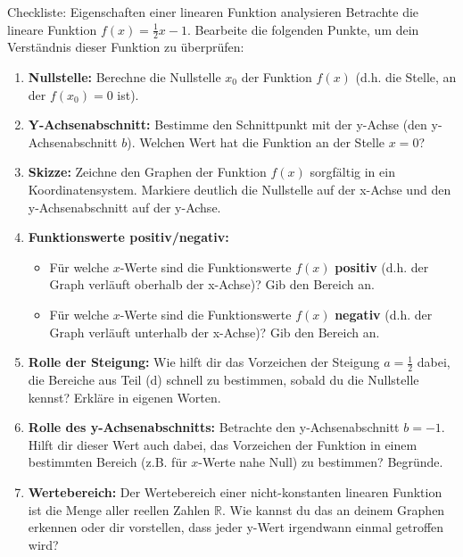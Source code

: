 \begin{aufgabenumgebung}{Checkliste: Eigenschaften einer linearen Funktion analysieren}
Betrachte die lineare Funktion $f(x) = \frac{1}{2}x - 1$.
Bearbeite die folgenden Punkte, um dein Verständnis dieser Funktion zu überprüfen:

\begin{enumerate}[label=(\alph*)]
    \item \textbf{Nullstelle:} Berechne die Nullstelle $x_0$ der Funktion $f(x)$ (d.h. die Stelle, an der $f(x_0)=0$ ist).
    \item \textbf{Y-Achsenabschnitt:} Bestimme den Schnittpunkt mit der y-Achse (den y-Achsenabschnitt $b$). Welchen Wert hat die Funktion an der Stelle $x=0$?
    \item \textbf{Skizze:} Zeichne den Graphen der Funktion $f(x)$ sorgfältig in ein Koordinatensystem. Markiere deutlich die Nullstelle auf der x-Achse und den y-Achsenabschnitt auf der y-Achse.
    \item \textbf{Funktionswerte positiv/negativ:}
    \begin{itemize}
        \item Für welche $x$-Werte sind die Funktionswerte $f(x)$ \textbf{positiv} (d.h. der Graph verläuft oberhalb der x-Achse)? Gib den Bereich an.
        \item Für welche $x$-Werte sind die Funktionswerte $f(x)$ \textbf{negativ} (d.h. der Graph verläuft unterhalb der x-Achse)? Gib den Bereich an.
    \end{itemize}
    \item \textbf{Rolle der Steigung:} Wie hilft dir das Vorzeichen der Steigung $a = \frac{1}{2}$ dabei, die Bereiche aus Teil (d) schnell zu bestimmen, sobald du die Nullstelle kennst? Erkläre in eigenen Worten.
    \item \textbf{Rolle des y-Achsenabschnitts:} Betrachte den y-Achsenabschnitt $b=-1$. Hilft dir dieser Wert auch dabei, das Vorzeichen der Funktion in einem bestimmten Bereich (z.B. für $x$-Werte nahe Null) zu bestimmen? Begründe.
    \item \textbf{Wertebereich:} Der Wertebereich einer nicht-konstanten linearen Funktion ist die Menge aller reellen Zahlen $\mathbb{R}$. Wie kannst du das an deinem Graphen erkennen oder dir vorstellen, dass jeder y-Wert irgendwann einmal getroffen wird?
\end{enumerate}
\end{aufgabenumgebung}

